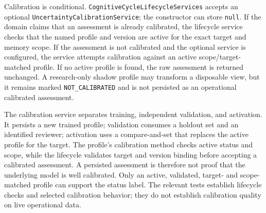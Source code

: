 Calibration is conditional. \texttt{CognitiveCycle\allowbreak{}LifecycleServices} accepts an optional \texttt{Uncertainty\allowbreak{}CalibrationService}; the constructor can store \texttt{null}. If the domain claims that an assessment is already calibrated, the lifecycle service checks that the named profile and version are active for the exact target and memory scope. If the assessment is not calibrated and the optional service is configured, the service attempts calibration against an active scope/target-matched profile. If no active profile is found, the raw assessment is returned unchanged. A research-only shadow profile may transform a disposable view, but it remains marked \texttt{NOT\_CALIBRATED} and is not persisted as an operational calibrated assessment.

The calibration service separates training, independent validation, and activation. It persists a new trained profile; validation consumes a holdout set and an identified reviewer; activation uses a compare-and-set that replaces the active profile for the target. The profile's calibration method checks active status and scope, while the lifecycle validates target and version binding before accepting a calibrated assessment. A persisted assessment is therefore not proof that the underlying model is well calibrated. Only an active, validated, target- and scope-matched profile can support the status label. The relevant tests establish lifecycle checks and selected calibration behavior; they do not establish calibration quality on live operational data.

